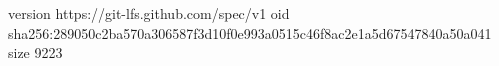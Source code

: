version https://git-lfs.github.com/spec/v1
oid sha256:289050c2ba570a306587f3d10f0e993a0515c46f8ac2e1a5d67547840a50a041
size 9223
